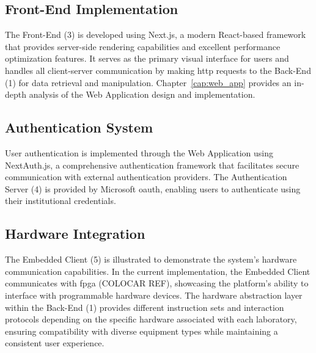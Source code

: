 \subsection*{Front-End Implementation}
The Front-End (3) is developed using Next.js, a modern React-based framework that provides server-side rendering capabilities and excellent performance optimization features. It serves as the primary visual interface for users and handles all client-server communication by making \ac{http} requests to the Back-End (1) for data retrieval and manipulation. Chapter~\ref{cap:web_app} provides an in-depth analysis of the Web Application design and implementation.

\subsection*{Authentication System}
User authentication is implemented through the Web Application using NextAuth.js, a comprehensive authentication framework that facilitates secure communication with external authentication providers. The Authentication Server (4) is provided by Microsoft \ac{oauth}, enabling users to authenticate using their institutional credentials.

\subsection*{Hardware Integration}
The Embedded Client (5) is illustrated to demonstrate the system's hardware communication capabilities. In the current implementation, the Embedded Client communicates with \ac{fpga} (COLOCAR REF), showcasing the platform's ability to interface with programmable hardware devices. The hardware abstraction layer within the Back-End (1) provides different instruction sets and interaction protocols depending on the specific hardware associated with each laboratory, ensuring compatibility with diverse equipment types while maintaining a consistent user experience.